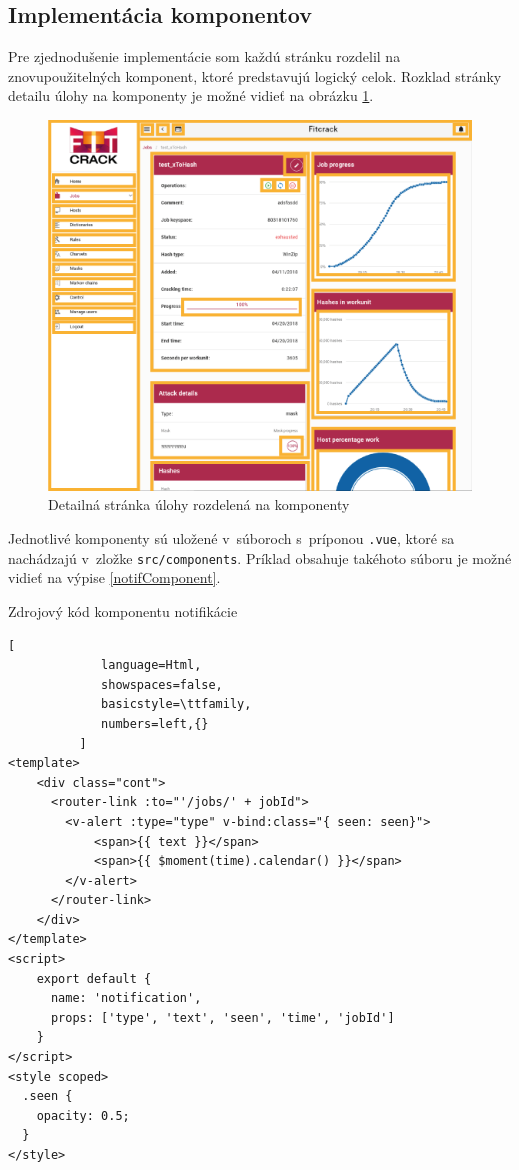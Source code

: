 \documentclass[slovak]{fitthesis}
\begin{document}
\subsection{Implementácia komponentov}
Pre zjednodušenie implementácie som každú stránku rozdelil na znovupoužitelných komponent, ktoré predstavujú logický celok. Rozklad stránky detailu úlohy na komponenty je možné vidieť na obrázku \ref{fig:komponenty}.
\begin{figure}[H]
    \centering
    \includegraphics[scale=0.45]{obrazky/komponenty.png}
    \caption{Detailná stránka úlohy rozdelená na komponenty}
    \label{fig:komponenty}
\end{figure}
Jednotlivé komponenty sú uložené v~súboroch s~príponou \texttt{.vue}, ktoré sa nachádzajú v~zložke \texttt{src/components}. Príklad obsahuje takéhoto súboru je možné vidieť na výpise \ref{notifComponent}.

\begin{algorithm}[H]
  \caption{Zdrojový kód komponentu notifikácie}
  \label{notifComponent}
  \begin{lstlisting}[
             language=Html,
             showspaces=false,
             basicstyle=\ttfamily,
             numbers=left,{}
          ]
<template>
    <div class="cont">
      <router-link :to="'/jobs/' + jobId">
        <v-alert :type="type" v-bind:class="{ seen: seen}">
            <span>{{ text }}</span>
            <span>{{ $moment(time).calendar() }}</span>
        </v-alert>
      </router-link>
    </div>
</template>
<script>
    export default {
      name: 'notification',
      props: ['type', 'text', 'seen', 'time', 'jobId']
    }
</script>
<style scoped>
  .seen {
    opacity: 0.5;
  }
</style>
  \end{lstlisting}
\end{algorithm}
\end{document}
